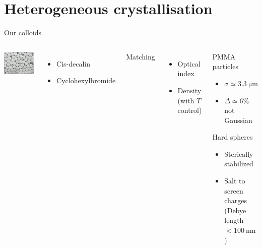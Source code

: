 \documentclass{beamer}
\begin{document}
\section{Heterogeneous crystallisation}

\begin{frame}{Our colloids}
	\begin{columns}
	\begin{center}
	\includegraphics[width=0.8\columnwidth, height=0.6\columnwidth]{SEM}
	\end{center}
	\begin{itemize}
		\item Cis-decalin
		\item Cyclohexylbromide
	\end{itemize}
	Matching
	\begin{itemize}
		\item Optical index
		\item Density (with $T$ control)
	\end{itemize}
	\begin{block}{PMMA particles}
		\begin{itemize}
			\item $\sigma \simeq \SI{3.3}{\micro\metre}$
			\item $\Delta \simeq 6\%$ not Gaussian
		\end{itemize}
		Hard spheres
		\begin{itemize}
			\item Sterically stabilized
			\item Salt to screen charges\\ (Debye length $<\SI{100}{\nano\metre}$)
		\end{itemize}
	\end{block}
	\end{columns}
\end{frame}
\end{document}
